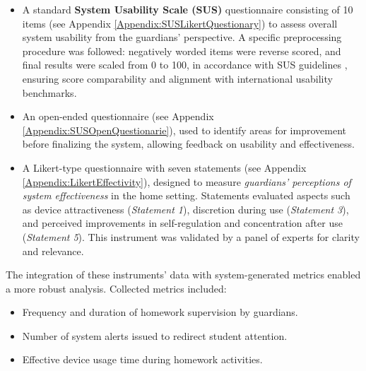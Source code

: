                 \begin{itemize}
                    \item A standard \textbf{System Usability Scale (SUS)} questionnaire consisting of 10 items (see Appendix \ref{Appendix:SUSLikertQuestionary}) to assess overall system usability from the guardians’ perspective. A specific preprocessing procedure was followed: negatively worded items were reverse scored, and final results were scaled from 0 to 100, in accordance with SUS guidelines \citep{Brown1989}, ensuring score comparability and alignment with international usability benchmarks.
                    
                    \item An open-ended questionnaire (see Appendix \ref{Appendix:SUSOpenQuestionarie}), used to identify areas for improvement before finalizing the system, allowing feedback on usability and effectiveness.
                    
                    \item A Likert-type questionnaire with seven statements (see Appendix \ref{Appendix:LikertEffectivity}), designed to measure \textit{guardians’ perceptions of system effectiveness} in the home setting. Statements evaluated aspects such as device attractiveness (\textit{Statement 1}), discretion during use (\textit{Statement 3}), and perceived improvements in self-regulation and concentration after use (\textit{Statement 5}). This instrument was validated by a panel of experts for clarity and relevance.
                \end{itemize}
                
                The integration of these instruments’ data with system-generated metrics enabled a more robust analysis. Collected metrics included:
                
                \begin{itemize}
                    \item Frequency and duration of homework supervision by guardians.
                    
                    \item Number of system alerts issued to redirect student attention.
                    
                    \item Effective device usage time during homework activities.
                \end{itemize}
                
